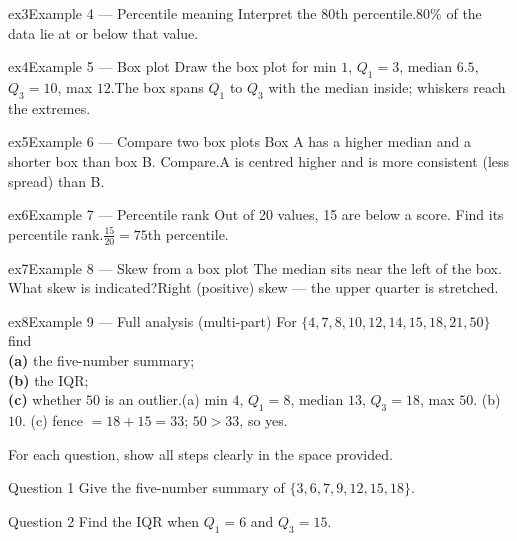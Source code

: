 \documentclass[11pt]{article}
\begin{document}
\begin{example}{ex3}{Example 4 --- Percentile meaning}
Interpret the $80$th percentile.\soln $80\%$ of the data lie at or below that value.
\end{example}

\begin{example}{ex4}{Example 5 --- Box plot}
Draw the box plot for min $1$, $Q_1=3$, median $6.5$, $Q_3=10$, max $12$.\soln The box spans $Q_1$ to $Q_3$ with the median inside; whiskers reach the extremes.
\end{example}

\begin{example}{ex5}{Example 6 --- Compare two box plots}
Box A has a higher median and a shorter box than box B. Compare.\soln A is centred higher and is more consistent (less spread) than B.
\end{example}

\begin{example}{ex6}{Example 7 --- Percentile rank}
Out of 20 values, 15 are below a score. Find its percentile rank.\soln $\tfrac{15}{20}=75$th percentile.
\end{example}

\begin{example}{ex7}{Example 8 --- Skew from a box plot}
The median sits near the left of the box. What skew is indicated?\soln Right (positive) skew --- the upper quarter is stretched.
\end{example}

\begin{example}{ex8}{Example 9 --- Full analysis (multi-part)}
For $\{4,7,8,10,12,14,15,18,21,50\}$ find \\ \textbf{(a)} the five-number summary; \\ \textbf{(b)} the IQR; \\ \textbf{(c)} whether $50$ is an outlier.\soln (a) min $4$, $Q_1=8$, median $13$, $Q_3=18$, max $50$. (b) $10$. (c) fence $=18+15=33$; $50>33$, so yes.
\end{example}

\clearpage
{}
For each question, show all steps clearly in the space provided.

\begin{qbox}{Question 1}
Give the five-number summary of $\{3,6,7,9,12,15,18\}$.\workspace{2.4cm}
\end{qbox}

\begin{qbox}{Question 2}
Find the IQR when $Q_1=6$ and $Q_3=15$.\workspace{2.4cm}
\end{qbox}
\end{document}
